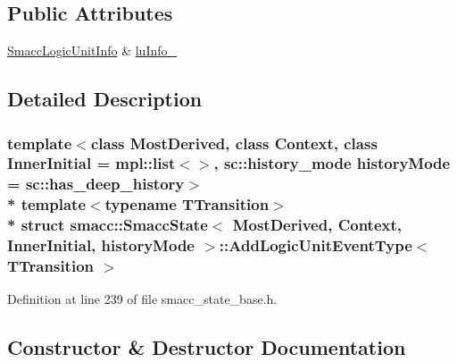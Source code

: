 \subsection*{Public Attributes}
\begin{DoxyCompactItemize}
\item 
\hyperlink{structsmacc_1_1introspection_1_1SmaccLogicUnitInfo}{Smacc\+Logic\+Unit\+Info} \& \hyperlink{structsmacc_1_1SmaccState_1_1AddLogicUnitEventType_a31c27ea945cd0127080c0bae872c028e}{lu\+Info\+\_\+}
\end{DoxyCompactItemize}


\subsection{Detailed Description}
\subsubsection*{template$<$class Most\+Derived, class Context, class Inner\+Initial = mpl\+::list$<$$>$, sc\+::history\+\_\+mode history\+Mode = sc\+::has\+\_\+deep\+\_\+history$>$\\*
template$<$typename T\+Transition$>$\\*
struct smacc\+::\+Smacc\+State$<$ Most\+Derived, Context, Inner\+Initial, history\+Mode $>$\+::\+Add\+Logic\+Unit\+Event\+Type$<$ T\+Transition $>$}



Definition at line 239 of file smacc\+\_\+state\+\_\+base.\+h.



\subsection{Constructor \& Destructor Documentation}
